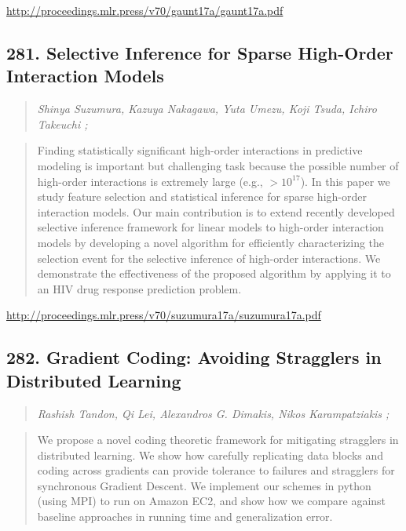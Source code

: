 \documentclass{article}
\begin{document}
\href{http://proceedings.mlr.press/v70/gaunt17a/gaunt17a.pdf}{http://proceedings.mlr.press/v70/gaunt17a/gaunt17a.pdf}

\subsection{281. Selective Inference for Sparse High-Order Interaction Models}

\begin{quote}
\footnotesize{\textit{Shinya Suzumura, Kazuya Nakagawa, Yuta Umezu, Koji Tsuda, Ichiro Takeuchi ;}}
\end{quote}

\begin{quote}
    Finding statistically significant high-order interactions in predictive modeling is important but challenging task because the possible number of high-order interactions is extremely large (e.g., $> 10^{17}$). In this paper we study feature selection and statistical inference for sparse high-order interaction models. Our main contribution is to extend recently developed selective inference framework for linear models to high-order interaction models by developing a novel algorithm for efficiently characterizing the selection event for the selective inference of high-order interactions. We demonstrate the effectiveness of the proposed algorithm by applying it to an HIV drug response prediction problem.  \end{quote}

\href{http://proceedings.mlr.press/v70/suzumura17a/suzumura17a.pdf}{http://proceedings.mlr.press/v70/suzumura17a/suzumura17a.pdf}

\subsection{282. Gradient Coding: Avoiding Stragglers in Distributed Learning}

\begin{quote}
\footnotesize{\textit{Rashish Tandon, Qi Lei, Alexandros G. Dimakis, Nikos Karampatziakis ;}}
\end{quote}

\begin{quote}
    We propose a novel coding theoretic framework for mitigating stragglers in distributed learning. We show how carefully replicating data blocks and coding across gradients can provide tolerance to failures and stragglers for synchronous Gradient Descent. We implement our schemes in python (using MPI) to run on Amazon EC2, and show how we compare against baseline approaches in running time and generalization error.  \end{quote}
\end{document}
